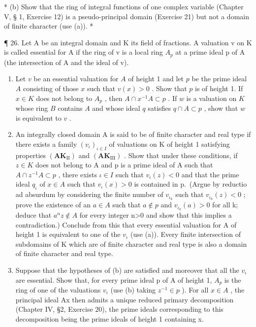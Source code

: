 * (b) Show that the ring of integral functions of one complex variable (Chapter V, § 1, Exercise 12) is a pseudo-principal domain (Exercise 21) but not a domain of finite character (use (a)). *

¶ 26. Let A be an integral domain and K its field of fractions. A valuation v on K is called essential for A if the ring of v is a local ring \(A_{p}\) at a prime ideal p of A (the intersection of A and the ideal of v).

\begin{enumerate}
\def\labelenumi{(\alph{enumi})}
\item
  Let \(v\) be an essential valuation for \(A\) of height 1 and let \(p\) be the prime ideal \(A\) consisting of those \(x\) such that \(v(x) > 0\) . Show that \(p\) is of height 1. If \(x \in K\) does not belong to \(A_p\) , then \(A \cap x^{-1}A \subset p\) . If \(w\) is a valuation on \(K\) whose ring \(B\) contains \(A\) and whose ideal \(q\) satisfies \(q \cap A \subset p\) , show that \(w\) is equivalent to \(v\) .
\item
  An integrally closed domain A is said to be of finite character and real type if there exists a family \((v_{\iota})_{\iota\in I}\) of valuations on K of height 1 satisfying properties \((\mathbf{AK}_{\mathrm{II}})\) and \((\mathbf{AK}_{\mathrm{III}})\) . Show that under these conditions, if \(z\in K\) does not belong to A and p is a prime ideal of A such that \(A\cap z^{-1}A\subset p\) , there exists \(\iota\in I\) such that \(v_{\iota}(z)<0\) and that the prime ideal \(q_{\iota}\) of \(x\in A\) such that \(v_{\iota}(x)>0\) is contained in p.~(Argue by reductio ad absurdum by considering the finite number of \(v_{\iota_{k}}\) such that \(v_{\iota_{k}}(z)<0\) ; prove the existence of an \(a\in A\) such that \(a\notin p\) and \(v_{\iota_{k}}(a)>0\) for all k; deduce that \(a^{n}z\notin A\) for every integer n\textgreater0 and show that this implies a contradiction.) Conclude from this that every essential valuation for A of height 1 is equivalent to one of the \(v_{\iota}\) (use (a)). Every finite intersection of subdomains of K which are of finite character and real type is also a domain of finite character and real type.
\item
  Suppose that the hypotheses of (b) are satisfied and moreover that all the \(v_{\iota}\) are essential. Show that, for every prime ideal p of A of height 1, \(A_{p}\) is the ring of one of the valuations \(v_{\iota}\) (use (b) taking \(z^{-1} \in p\) ). For all \(x \in A\) , the principal ideal Ax then admits a unique reduced primary decomposition (Chapter IV, §2, Exercise 20), the prime ideals corresponding to this decomposition being the prime ideals of height 1 containing x.

\end{enumerate}
